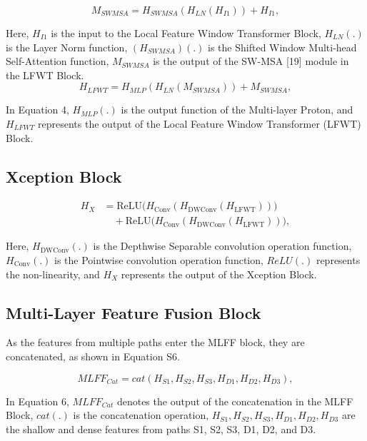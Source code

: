 \documentclass[journal]{IEEEtran}
\begin{document}
\begin{equation}
{M_{SWMSA}}= {H_{SWMSA}}({H_{LN}}({H_{I1}})) + {H_{I1}}, \tag{S3}
\end{equation}

Here,  ${H_{I1}}$ is the input to the Local Feature Window Transformer Block, ${H_{LN}}$$(.)$ is the Layer Norm function, $({H_{SWMSA}})$$(.)$ is the Shifted Window Multi-head Self-Attention function, ${M_{SWMSA}}$  is the output of the SW-MSA [19] module in the LFWT Block.
\begin{equation}
{H_{LFWT}}= {H_{MLP}}({H_{LN}}({M_{SWMSA}})) + {M_{SWMSA}},  \tag{S4}
\end{equation}

In Equation 4, ${H_{MLP}}$$(.)$ is the output function of the Multi-layer Proton, and ${H_{LFWT}}$ represents the output of the Local Feature Window Transformer (LFWT) Block. 


\subsection{Xception Block}

\begin{equation}
\begin{aligned}
    {H_{X}} &= \text{ReLU}\bigl(H_{\text{Conv}}(H_{\text{DWConv}}(H_{\text{LFWT}}))\bigr) \\ 
    &\quad+ \text{ReLU}\bigl(H_{\text{Conv}}(H_{\text{DWConv}}(H_{\text{LFWT}}))\bigr), 
\end{aligned}
\tag{S5}
\end{equation}

Here, $H_{\text{DWConv}}$$(.)$ is the Depthwise Separable convolution operation function, ${H_{\text{Conv}}}$$(.)$  is the Pointwise convolution operation function, ${ReLU}$$(.)$ represents the non-linearity, and ${H_{X}}$ represents the output of the Xception Block. 

\subsection{Multi-Layer Feature Fusion Block}
As the features from multiple paths enter the MLFF block, they are concatenated, as shown in Equation S6. 

\begin{equation}
{MLFF_{Cat}}= {cat}({H_{S1}},{H_{S2}},{H_{S3}},{H_{D1}},{H_{D2}},{H_{D3}}), \tag{S6}
\end{equation}

In Equation 6, ${MLFF_{Cat}}$ denotes the output of the concatenation in the MLFF Block, ${cat}$$(.)$ is the concatenation operation, ${H_{S1}},{H_{S2}},{H_{S3}},{H_{D1}},{H_{D2}},{H_{D3}}$ are the shallow and dense features from paths S1, S2, S3, D1, D2, and D3. 
\end{document}
